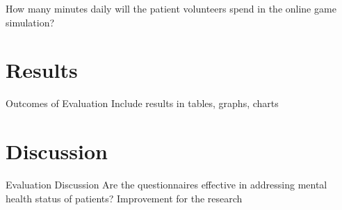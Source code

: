\documentclass[12pt,letterpaper]{article}
\begin{document}
 How many minutes daily will the patient volunteers spend in the online game simulation? 
 
\section{Results}
 Outcomes of Evaluation	
 Include results in tables, graphs, charts
 
\section{Discussion}
 Evaluation Discussion
 Are the questionnaires effective in addressing mental health status of patients?
 Improvement for the research

\nocite{*}


\end{document}
